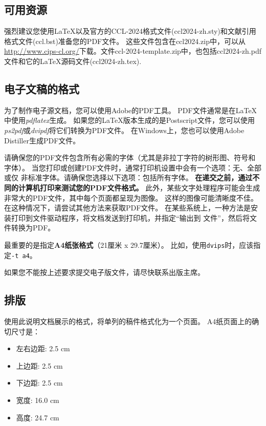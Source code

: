 \documentclass[11pt]{article}
\begin{document}
\begin{CJK*}{UTF8}{gbsn}
\subsection{可用资源}

强烈建议您使用\LaTeX{}以及官方的CCL-2024格式文件(ccl2024-zh.sty)和文献引用格式文件(ccl.bst)准备您的PDF文件。
这些文件包含在ccl2024.zip中，可以从\url{http://www.cips-cl.org/}下载。文件ccl-2024-template.zip中，也包括ccl2024-zh.pdf文件和它的\LaTeX{}源码文件(ccl2024-zh.tex).


\subsection{电子文稿的格式}
\label{sect:pdf}

为了制作电子源文档，您可以使用Adobe的PDF工具。 PDF文件通常是在\LaTeX{}中使用\textit{pdflatex}生成。
如果您的\LaTeX{}版本生成的是Postscript文件，您可以使用\textit{ps2pdf}或\textit {dvipdf}将它们转换为PDF文件。
在Windows上，您也可以使用Adobe Distiller生成PDF文件。

请确保您的PDF文件包含所有必需的字体（尤其是非拉丁字符的树形图、符号和字体）。
当您打印或创建PDF文件时，通常打印机设置中会有一个选项：无、全部或仅
非标准字体。请确保您选择以下选项：包括所有字体。
\textbf{在递交之前，通过不同的计算机打印来测试您的PDF文件格式。}
此外，某些文字处理程序可能会生成非常大的PDF文件，其中每个页面都呈现为图像。
这样的图像可能清晰度不佳。在这种情况下，请尝试其他方法来获取PDF文件。
在某些系统上，一种方法是安装打印到文件驱动程序，将文档发送到打印机，并指定“输出到
文件”，然后将文件转换为PDF。

最重要的是指定\textbf{A4纸张格式}（21厘米 x 29.7厘米）。
比如，使用{\tt dvips}时，应该指定{\tt -t a4}。

如果您不能按上述要求提交电子版文件，请尽快联系出版主席。

\subsection{排版}
\label{ssec:layout}

使用此说明文档展示的格式，将单列的稿件格式化为一个页面。
A4纸页面上的确切尺寸是：

\begin{itemize}
\item 左右边距: 2.5 cm
\item 上边距: 2.5 cm
\item 下边距: 2.5 cm
\item 宽度: 16.0 cm
\item 高度: 24.7 cm
\end{itemize}


\end{CJK*}
\end{document}
